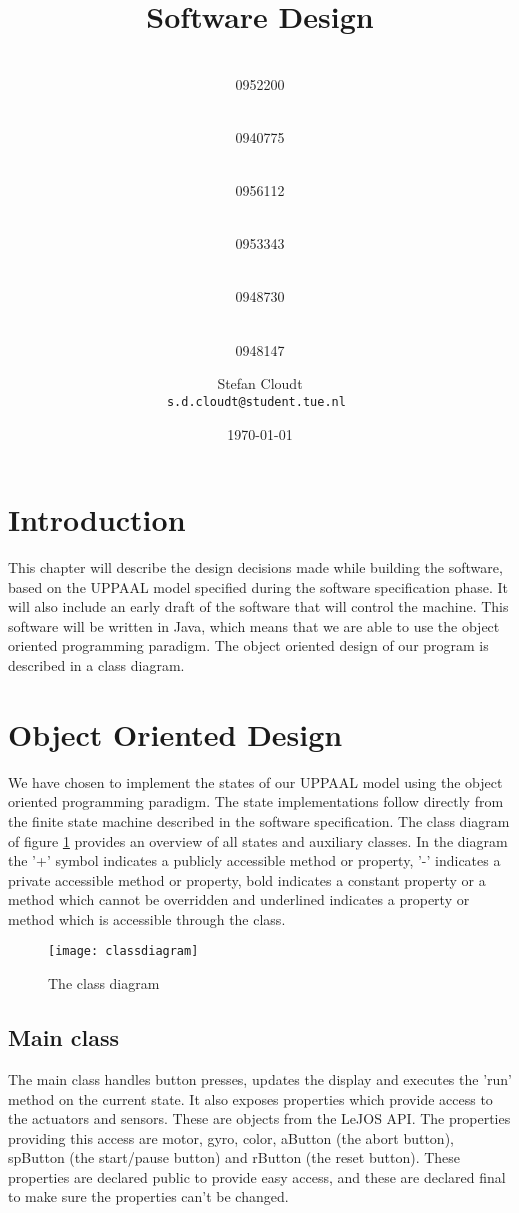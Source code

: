 \documentclass[a4paper,oneside,11pt]{article}
\title{\vspace{-\baselineskip}\sffamily\bfseries Software Design}
\author{
	\makebox[.25\linewidth]{Sergio van Amerongen}\\0952200 \and
	\makebox[.25\linewidth]{Stefan Cloudt}\\0940775 \and
	\makebox[.25\linewidth]{Daan de Graaf}\\0956112 \and
	\makebox[.25\linewidth]{Robert van Lente}\\0953343 \and
	\makebox[.25\linewidth]{Tom Peters}\\0948730 \and
	\makebox[.25\linewidth]{Berrie Trippe}\\0948147 
	\and \makebox[.75\linewidth]{\textbf{Responsible:}} \and
	Stefan Cloudt\\ \tt{s.d.cloudt@student.tue.nl}
}
\date{\today}
\begin{document}
\maketitle
\section{Introduction}
This chapter will describe the design decisions made while building the software, based on the UPPAAL model specified during the software specification phase. It will also include an early draft of the software that will control the machine. This software will be written in Java, which means that we are able to use the object oriented programming paradigm. The object oriented design of our program is described in a class diagram.

\section{Object Oriented Design}
We have chosen to implement the states of our UPPAAL model using the object oriented programming paradigm. The state implementations follow directly from the finite state machine described in the software specification. The class diagram of figure \ref{classdiagram} provides an overview of all states and auxiliary classes. In the diagram the '+' symbol indicates a publicly accessible method or property, '-' indicates a private accessible method or property, bold indicates a constant property or a method which cannot be overridden and underlined indicates a property or method which is accessible through the class.

\begin{figure}[ht!]
\centering
\texttt{[image: classdiagram]}
\caption{The class diagram}
\label{classdiagram}
\end{figure}

\newpage
\subsection{Main class}
The main class handles button presses, updates the display and executes the 'run' method on the current state. It also exposes properties which provide access to the actuators and sensors. These are objects from the LeJOS API. The properties providing this access are motor, gyro, color, aButton (the abort button), spButton (the start/pause button) and rButton (the reset button). These properties are declared public to provide easy access, and these are declared final to make sure the properties can’t be changed.
\end{document}
